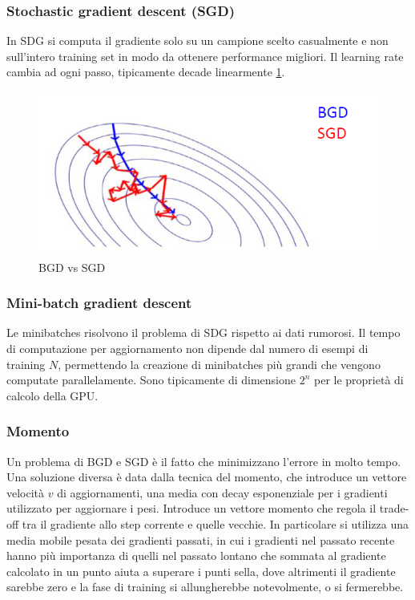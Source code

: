 		\subsubsection{Stochastic gradient descent (SGD)}
		In SDG si computa il gradiente solo su un campione scelto casualmente e non sull'intero training set in modo da ottenere performance migliori.
		Il learning rate cambia ad ogni passo, tipicamente decade linearmente \ref{fig:chapter11-11}.
		
		
		
		\begin{figure}
			\centering
			\includegraphics[width=0.6\linewidth]{imgs/chapter11/img11}
			\caption{BGD vs SGD}
			\label{fig:chapter11-11}
		\end{figure}
	
		\subsubsection{Mini-batch gradient descent}
		Le minibatches risolvono il problema di SDG rispetto ai dati rumorosi.
		Il tempo di computazione per aggiornamento non dipende dal numero di esempi di training $N$, permettendo la creazione di minibatches pi\`u grandi che vengono computate parallelamente.
		Sono tipicamente di dimensione $2^n$ per le propriet\`a di calcolo della GPU.

		\subsubsection{Momento}
		Un problema di BGD e SGD \`e il fatto che minimizzano l'errore in molto tempo.
		Una soluzione diversa \`e data dalla tecnica del momento, che introduce un vettore velocit\`a $v$ di aggiornamenti, una media con decay esponenziale per i gradienti utilizzato per aggiornare i pesi.
		Introduce un vettore momento che regola il trade-off tra il gradiente allo step corrente e quelle vecchie. In particolare si utilizza una media mobile pesata dei gradienti passati, in cui i gradienti nel passato recente hanno pi\`u importanza di quelli nel passato lontano che sommata al gradiente calcolato in un punto aiuta a superare i punti sella, dove altrimenti il gradiente sarebbe zero e la fase di training si allungherebbe notevolmente, o si fermerebbe. \\
		

